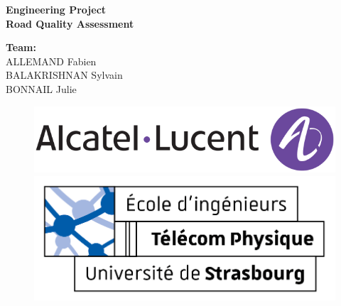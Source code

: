\documentclass{article}
\begin{document}
\thispagestyle{empty}
\addtocounter{page}{-1}
\begin{center}
    \baselineskip=50pt
    \vspace*{1cm}
    \textbf{{\Huge Engineering Project}}\\
    \vspace*{0.25cm}
    \textbf{{\Huge Road Quality Assessment}}\\
    \vspace*{0.25cm}
    \begin{minipage}[c]{.46\linewidth}
        \centering
        \textbf{Team:}\\
        ALLEMAND Fabien\\BALAKRISHNAN Sylvain\\BONNAIL Julie
    \end{minipage}
\end{center}
\vspace*{0.1cm}

\begin{figure}[H]
    \centering
    \centerline{\includegraphics[scale=.66]{../../common/logo_Alcatel_1.png}}
    \vspace*{0.1cm}
    \centerline{\includegraphics[scale=1.25]{../../common/logo_TPS_2.png}}
\end{figure}

\newpage
\vspace*{0.01cm}
\tableofcontents

\newpage
\vspace*{0.01cm}
\listoffigures

\newpage
\vspace*{0.01cm}















\newpage
\vspace*{0.01cm}


\end{document}

